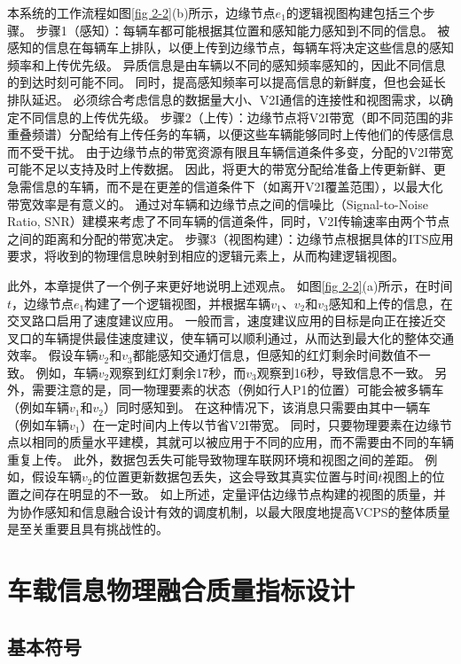 本系统的工作流程如图\ref{fig 2-2}(b)所示，边缘节点$e_1$的逻辑视图构建包括三个步骤。
步骤1（感知）：每辆车都可能根据其位置和感知能力感知到不同的信息。
被感知的信息在每辆车上排队，以便上传到边缘节点，每辆车将决定这些信息的感知频率和上传优先级。
异质信息是由车辆以不同的感知频率感知的，因此不同信息的到达时刻可能不同。
同时，提高感知频率可以提高信息的新鲜度，但也会延长排队延迟。
必须综合考虑信息的数据量大小、V2I通信的连接性和视图需求，以确定不同信息的上传优先级。
步骤2（上传）：边缘节点将V2I带宽（即不同范围的非重叠频谱）分配给有上传任务的车辆，以便这些车辆能够同时上传他们的传感信息而不受干扰。
由于边缘节点的带宽资源有限且车辆信道条件多变，分配的V2I带宽可能不足以支持及时上传数据。
因此，将更大的带宽分配给准备上传更新鲜、更急需信息的车辆，而不是在更差的信道条件下（如离开V2I覆盖范围），以最大化带宽效率是有意义的。
通过对车辆和边缘节点之间的信噪比（Signal-to-Noise Ratio,  SNR）建模来考虑了不同车辆的信道条件，同时，V2I传输速率由两个节点之间的距离和分配的带宽决定。
步骤3（视图构建）：边缘节点根据具体的ITS应用要求，将收到的物理信息映射到相应的逻辑元素上，从而构建逻辑视图。

此外，本章提供了一个例子来更好地说明上述观点。
如图\ref{fig 2-2}(a)所示，在时间 $t$，边缘节点$e_1$构建了一个逻辑视图，并根据车辆$v_1$、$v_2$和$v_3$感知和上传的信息，在交叉路口启用了速度建议应用。
一般而言，速度建议应用的目标是向正在接近交叉口的车辆提供最佳速度建议，使车辆可以顺利通过，从而达到最大化的整体交通效率。
假设车辆$v_2$和$v_3$都能感知交通灯信息，但感知的红灯剩余时间数值不一致。
例如，车辆$v_2$观察到红灯剩余17秒，而$v_3$观察到16秒，导致信息不一致。
另外，需要注意的是，同一物理要素的状态（例如行人P1的位置）可能会被多辆车（例如车辆$v_1$和$v_2$）同时感知到。
在这种情况下，该消息只需要由其中一辆车（例如车辆$v_1$）在一定时间内上传以节省V2I带宽。
同时，只要物理要素在边缘节点以相同的质量水平建模，其就可以被应用于不同的应用，而不需要由不同的车辆重复上传。
此外，数据包丢失可能导致物理车联网环境和视图之间的差距。
例如，假设车辆$v_2$的位置更新数据包丢失，这会导致其真实位置与时间$t$视图上的位置之间存在明显的不一致。
如上所述，定量评估边缘节点构建的视图的质量，并为协作感知和信息融合设计有效的调度机制，以最大限度地提高VCPS的整体质量是至关重要且具有挑战性的。

\section{车载信息物理融合质量指标设计}\label{section 2-4}

\subsection{基本符号}

